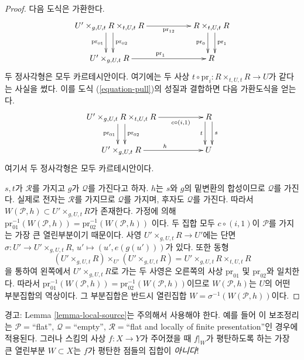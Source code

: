 \begin{proof}
다음 도식은 가환한다.
$$
\xymatrix{
U' \times_{g, U, t} R \times_{t, U, t} R
\ar[rr]_-{\text{pr}_{12}}
\ar@<1ex>[d]^-{\text{pr}_{02}} \ar@<-1ex>[d]_-{\text{pr}_{01}} & &
R \times_{t, U, t} R
\ar@<1ex>[d]^-{\text{pr}_1} \ar@<-1ex>[d]_-{\text{pr}_0}
\\
U' \times_{g, U, t} R \ar[rr]^{\text{pr}_1} & & R
}
$$
두 정사각형은 모두 카르테시안이다. 여기에는 두 사상
$t \circ \text{pr}_i : R \times_{t, U, t} R \to U$가 같다는 사실을 썼다.
이를 도식 (\ref{equation-pull})의 성질과 결합하면 다음 가환도식을 얻는다.
$$
\xymatrix{
U' \times_{g, U, t} R \times_{t, U, t} R
\ar[rr]_-{c \circ (i, 1)}
\ar@<1ex>[d]^-{\text{pr}_{02}} \ar@<-1ex>[d]_-{\text{pr}_{01}} & &
R
\ar@<1ex>[d]^-{s} \ar@<-1ex>[d]_-{t}
\\
U' \times_{g, U, t} R \ar[rr]^h & & U
}
$$
여기서 두 정사각형은 모두 카르테시안이다.

\medskip\noindent
$s, t$가 $\mathcal{R}$를 가지고 $g$가 $\mathcal{Q}$를 가진다고 하자.
$h$는 $s$와 $g$의 밑변환의 합성이므로 $\mathcal{Q}$를 가진다.
실제로 전자는 $\mathcal{R}$를 가지므로 $\mathcal{Q}$를 가지며,
후자도 $\mathcal{Q}$를 가진다. 따라서
$W(\mathcal{P}, h) \subset U' \times_{g, U, t} R$가 존재한다.
가정에 의해
$\text{pr}_{01}^{-1}(W(\mathcal{P}, h)) =
\text{pr}_{02}^{-1}(W(\mathcal{P}, h))$
이다. 두 집합 모두 $c \circ (i, 1)$이 $\mathcal{P}$를 가지는 가장 큰
열린부분이기 때문이다. 사영 $U' \times_{g, U, t} R \to U'$에는 단면
$\sigma : U' \to U' \times_{g, U, t} R$, $u' \mapsto (u', e(g(u')))$가 있다.
또한 동형
$$
(U' \times_{g, U, t} R) \times_{U'} (U' \times_{g, U, t} R)
=
U' \times_{g, U, t} R \times_{t, U, t} R
$$
을 통하여 왼쪽에서 $U' \times_{g, U, t} R$로 가는 두 사영은
오른쪽의 사상 $\text{pr}_{01}$ 및
$\text{pr}_{02}$와 일치한다. 따라서
$\text{pr}_{01}^{-1}(W(\mathcal{P}, h)) =
\text{pr}_{02}^{-1}(W(\mathcal{P}, h))$이므로
$W(\mathcal{P}, h)$는 $U$의 어떤 부분집합의 역상이다. 그 부분집합은
반드시 열린집합 $W = \sigma^{-1}(W(\mathcal{P}, h))$이다.
\end{proof}

\begin{remark}
\label{remark-local-source-warning}
경고:
Lemma \ref{lemma-local-source}는 주의해서 사용해야 한다.
예를 들어 이 보조정리는 $\mathcal{P}=$``flat'', $\mathcal{Q}=$``empty'',
$\mathcal{R}=$``flat and locally of finite presentation''인 경우에 적용된다.
그러나 스킴의 사상 $f : X \to Y$가 주어졌을 때 $f|_W$가 평탄하도록 하는
가장 큰 열린부분 $W \subset X$는 $f$가 평탄한 점들의 집합이 {\it 아니다}!
\end{remark}

